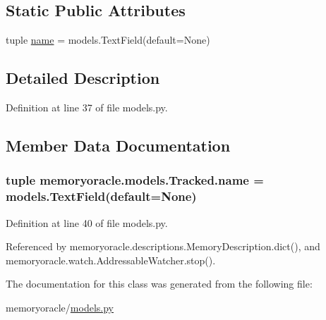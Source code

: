 \subsection*{Static Public Attributes}
\begin{DoxyCompactItemize}
\item 
tuple \hyperlink{classmemoryoracle_1_1models_1_1Tracked_aa2a8b10602cca71014447d2f8da9943e}{name} = models.\+Text\+Field(default=None)
\end{DoxyCompactItemize}


\subsection{Detailed Description}


Definition at line 37 of file models.\+py.



\subsection{Member Data Documentation}
\hypertarget{classmemoryoracle_1_1models_1_1Tracked_aa2a8b10602cca71014447d2f8da9943e}{}
\subsubsection[{name}]{\setlength{\rightskip}{0pt plus 5cm}tuple memoryoracle.\+models.\+Tracked.\+name = models.\+Text\+Field(default=None)\hspace{0.3cm}{\ttfamily [static]}}\label{classmemoryoracle_1_1models_1_1Tracked_aa2a8b10602cca71014447d2f8da9943e}


Definition at line 40 of file models.\+py.



Referenced by memoryoracle.\+descriptions.\+Memory\+Description.\+dict(), and memoryoracle.\+watch.\+Addressable\+Watcher.\+stop().



The documentation for this class was generated from the following file\+:\begin{DoxyCompactItemize}
\item 
memoryoracle/\hyperlink{models_8py}{models.\+py}\end{DoxyCompactItemize}
